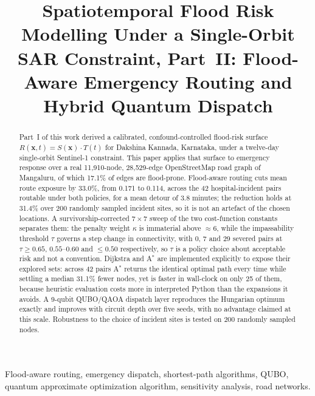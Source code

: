 \documentclass[journal]{IEEEtran}
\newcommand{\Sx}{S(\mathbf{x})}
\newcommand{\Tt}{T(t)}
\newcommand{\Rxt}{R(\mathbf{x},t)}
\begin{document}
\title{Spatiotemporal Flood Risk Modelling Under a Single-Orbit SAR Constraint, Part~II: Flood-Aware Emergency Routing and Hybrid Quantum Dispatch}

\author{}

\maketitle

\begin{abstract}
Part~I of this work derived a calibrated, confound-controlled
flood-risk surface $\Rxt=\Sx\cdot\Tt$ for Dakshina Kannada, Karnataka, under a
twelve-day single-orbit Sentinel-1 constraint. This paper applies that surface
to emergency response over a real 11{,}910-node, 28{,}529-edge OpenStreetMap
road graph of Mangaluru, of which 17.1\% of edges are flood-prone. Flood-aware
routing cuts mean route exposure by 33.0\%, from 0.171 to 0.114, across the 42
hospital-incident pairs routable under both policies, for a mean detour of
3.8 minutes; the reduction holds at 31.4\% over 200 randomly sampled incident
sites, so it is not an artefact of the chosen locations. A survivorship-corrected
$7\times7$ sweep of the two cost-function constants separates them: the penalty
weight $\kappa$ is immaterial above $\approx 6$, while the impassability
threshold $\tau$ governs a step change in connectivity, with 0, 7 and 29 severed
pairs at $\tau\ge0.65$, $0.55$--$0.60$ and $\le0.50$ respectively, so $\tau$ is
a policy choice about acceptable risk and not a convention. Dijkstra and
A$^\ast$ are implemented explicitly to expose their explored sets: across 42
pairs A$^\ast$ returns the identical optimal path every time while settling a
median 31.1\% fewer nodes, yet is faster in wall-clock on only 25 of them,
because heuristic evaluation costs more in interpreted Python than the
expansions it avoids. A 9-qubit QUBO/QAOA dispatch layer reproduces the
Hungarian optimum exactly and improves with circuit depth over five seeds, with
no advantage claimed at this scale. Robustness to the choice of incident sites
is tested on 200 randomly sampled nodes.
\end{abstract}

\begin{IEEEkeywords}
Flood-aware routing, emergency dispatch, shortest-path algorithms, QUBO, quantum approximate optimization algorithm, sensitivity analysis, road networks.
\end{IEEEkeywords}
\end{document}

